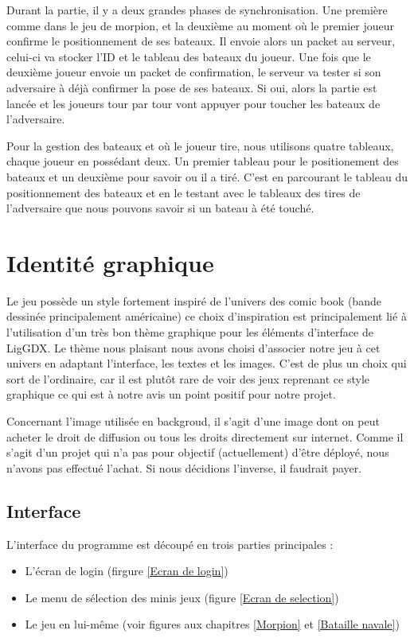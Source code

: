 \documentclass{report}
\begin{document}
Durant la partie, il y a deux grandes phases de synchronisation. Une première comme dans le jeu de morpion, et la deuxième au moment où le premier joueur confirme le positionnement
de ses bateaux. Il envoie alors un packet au serveur, celui-ci va stocker l’ID et le tableau des bateaux du joueur. Une fois que le deuxième joueur envoie un packet de confirmation,
le serveur va tester si son adversaire à déjà confirmer la pose de ses bateaux. Si oui, alors la partie est lancée et les joueurs tour par tour vont appuyer pour toucher les bateaux
de l’adversaire.\par{}
Pour la gestion des bateaux et où le joueur tire, nous utilisons quatre tableaux, chaque joueur en possédant deux. Un premier tableau pour le positionement des bateaux et un deuxième pour
savoir ou il a tiré. C'est en parcourant le tableau du positionnement des bateaux et en le testant avec le tableaux des tires de l'adversaire que nous pouvons savoir si un bateau
à été touché.

\chapter{Identité graphique}
Le jeu possède un style fortement inspiré de l'univers des comic book (bande dessinée principalement américaine)
ce choix d'inspiration est principalement lié à l'utilisation d'un très bon thème graphique pour les éléments
d'interface de LigGDX. Le thème nous plaisant nous avons choisi d'associer notre jeu à cet univers en adaptant l'interface, les
textes et les images. C'est de plus un choix qui sort de l'ordinaire, car il est plutôt rare de voir des jeux
reprenant ce style graphique ce qui est à notre avis un point positif pour notre projet.
\par
Concernant l'image utilisée en backgroud, il s'agit d'une image dont on peut acheter le droit de diffusion ou tous les droits directement sur internet. Comme il s'agit d'un projet qui n'a pas pour objectif (actuellement) d'être déployé, nous n'avons pas effectué l'achat. Si nous décidions l'inverse, il faudrait payer.

\section{Interface}
L'interface du programme est découpé en trois parties principales :

\begin{itemize}
  \item L'écran de login (firgure \ref{Ecran de login})
  \item Le menu de sélection des minis jeux (figure \ref{Ecran de selection})
  \item Le jeu en lui-même (voir figures aux chapitres \ref{Morpion} et \ref{Bataille navale})
\end{itemize}
\end{document}
